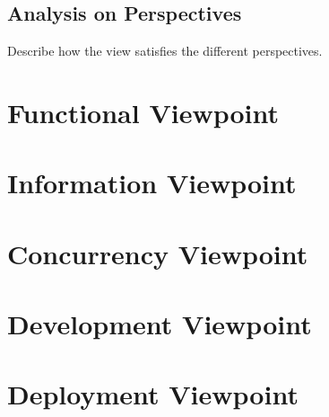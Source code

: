 \documentclass{article}
\begin{document}
\subsection*{Analysis on Perspectives}
Describe how the view satisfies the different perspectives. 

\section*{Functional Viewpoint}

\section*{Information Viewpoint}

\section*{Concurrency Viewpoint}

\section*{Development Viewpoint}

\section*{Deployment Viewpoint}
\end{document}
